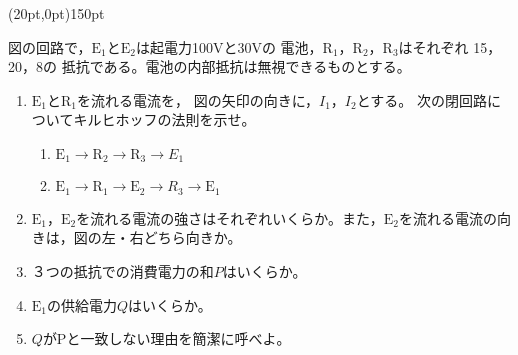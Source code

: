 \hakosyokika
\item
    \begin{mawarikomi}(20pt,0pt){150pt}{
        
    }
    図の回路で，$\mathrm{E_1}$と$\mathrm{E_2}$は起電力100Vと30Vの
    電池，$\mathrm{R_1}$，$\mathrm{R_2}$，$\mathrm{R_3}$はそれぞれ
    15\sftanni{\Omega }，20\sftanni{\Omega }，8\sftanni{\Omega }の
    抵抗である。電池の内部抵抗は無視できるものとする。
        \begin{enumerate}
            \item $\mathrm{E_1}$と$\mathrm{R_1}$を流れる電流を，
            図の矢印の向きに，$I_1$，$I_2$とする。
            次の閉回路についてキルヒホッフの法則を示せ。
                \begin{enumerate}
                    \item $\mathrm{E_1}\rightarrow \mathrm{R_2}\rightarrow \mathrm{R_3}\rightarrow E_1$
                    \item $\mathrm{E_1}\rightarrow \mathrm{R_1}\rightarrow \mathrm{E_2}\rightarrow R_3\rightarrow \mathrm{E_1}$
                \end{enumerate}
            \item $\mathrm{E_1}$，$\mathrm{E_2}$を流れる電流の強さはそれぞれいくらか。また，$\mathrm{E_2}$を流れる電流の向きは，図の左・右どちら向きか。
            \item ３つの抵抗での消費電力の和$P$はいくらか。
            \item $\mathrm{E_1}$の供給電力$Q$はいくらか。
            \item $Q$がPと一致しない理由を簡潔に呼べよ。
        \end{enumerate}
    \end{mawarikomi}